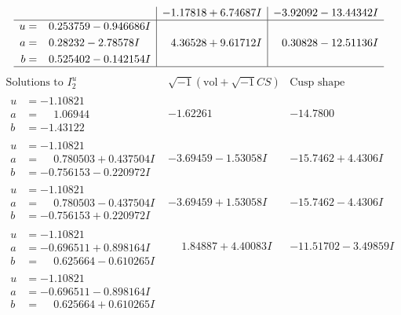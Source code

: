 \documentclass[1p]{elsarticle_modified}
\theoremstyle{definition}
\newcommand{\I}{\sqrt{-1}}
\begin{document}
$$\begin{array}{c|c|c}
 & -1.17818 + 6.74687 I & -3.92092 - 13.44342 I \\ \hline\begin{aligned}
u &= \phantom{-}0.253759 - 0.946686 I \\
a &= \phantom{-}0.28232 - 2.78578 I \\
b &= \phantom{-}0.525402 - 0.142154 I\end{aligned}
 & \phantom{-}4.36528 + 9.61712 I & \phantom{-}0.30828 - 12.51136 I\\
 \hline 
 \end{array}$$\newpage$$\begin{array}{c|c|c}  
\text{Solutions to }I^u_{2}& \I (\text{vol} + \sqrt{-1}CS) & \text{Cusp shape}\\
 \hline 
\begin{aligned}
u &= -1.10821\phantom{ +0.000000I} \\
a &= \phantom{-}1.06944\phantom{ +0.000000I} \\
b &= -1.43122\phantom{ +0.000000I}\end{aligned}
 & -1.62261\phantom{ +0.000000I} & -14.7800\phantom{ +0.000000I} \\ \hline\begin{aligned}
u &= -1.10821\phantom{ +0.000000I} \\
a &= \phantom{-}0.780503 + 0.437504 I \\
b &= -0.756153 - 0.220972 I\end{aligned}
 & -3.69459 - 1.53058 I & -15.7462 + 4.4306 I \\ \hline\begin{aligned}
u &= -1.10821\phantom{ +0.000000I} \\
a &= \phantom{-}0.780503 - 0.437504 I \\
b &= -0.756153 + 0.220972 I\end{aligned}
 & -3.69459 + 1.53058 I & -15.7462 - 4.4306 I \\ \hline\begin{aligned}
u &= -1.10821\phantom{ +0.000000I} \\
a &= -0.696511 + 0.898164 I \\
b &= \phantom{-}0.625664 - 0.610265 I\end{aligned}
 & \phantom{-}1.84887 + 4.40083 I & -11.51702 - 3.49859 I \\ \hline\begin{aligned}
u &= -1.10821\phantom{ +0.000000I} \\
a &= -0.696511 - 0.898164 I \\
b &= \phantom{-}0.625664 + 0.610265 I\end{aligned}

\end{array}$$
\end{document}
